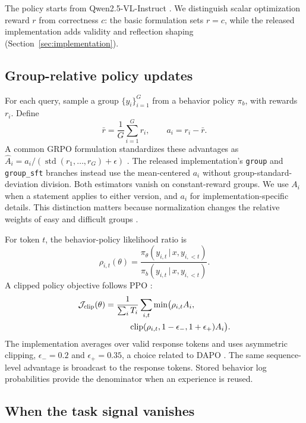 \documentclass[twocolumn]{article}
\newcommand{\given}{\,\vert\,}
\DeclareMathOperator{\clip}{clip}
\DeclareMathOperator{\std}{std}
\begin{document}
The policy starts from Qwen2.5-VL-Instruct \citep{qwen2_5_vl}. We distinguish scalar optimization reward $r$ from correctness $c$: the basic formulation sets $r=c$, while the released implementation adds validity and reflection shaping (Section~\ref{sec:implementation}).

\subsection{Group-relative policy updates}

For each query, sample a group $\{y_i\}_{i=1}^G$ from a behavior policy $\pi_b$, with rewards $r_i$. Define
\begin{equation}
 \bar r=\frac{1}{G}\sum_{i=1}^G r_i,\qquad
 a_i=r_i-\bar r.
 \label{eq:centered}
\end{equation}
A common GRPO formulation standardizes these advantages as $\widehat A_i=a_i/(\std(r_1,\ldots,r_G)+\epsilon)$ \citep{deepseek-r1}. The released implementation's \texttt{group} and \texttt{group\_sft} branches instead use the mean-centered $a_i$ without group-standard-deviation division. Both estimators vanish on constant-reward groups. We use $A_i$ when a statement applies to either version, and $a_i$ for implementation-specific details. This distinction matters because normalization changes the relative weights of easy and difficult groups \citep{drgrpo}.

For token $t$, the behavior-policy likelihood ratio is
\begin{equation}
 \rho_{i,t}(\theta)=
 \frac{\pi_\theta(y_{i,t}\given x,y_{i,<t})}
 {\pi_b(y_{i,t}\given x,y_{i,<t})}.
 \label{eq:ratio}
\end{equation}
A clipped policy objective follows PPO \citep{ppo}:
\begin{align}
 \mathcal J_{\mathrm{clip}}(\theta)
 &=\frac{1}{\sum_i T_i}\sum_{i,t}
 \min\bigl(\rho_{i,t}A_i,\nonumber\\
 &\hspace{10mm}\clip(\rho_{i,t},1-\epsilon_-,1+\epsilon_+)A_i\bigr).
 \label{eq:clip}
\end{align}
The implementation averages over valid response tokens and uses asymmetric clipping, $\epsilon_-=0.2$ and $\epsilon_+=0.35$, a choice related to DAPO \citep{dapo}. The same sequence-level advantage is broadcast to the response tokens. Stored behavior log probabilities provide the denominator when an experience is reused.

\subsection{When the task signal vanishes}
\label{sec:vanishing}
\end{document}
